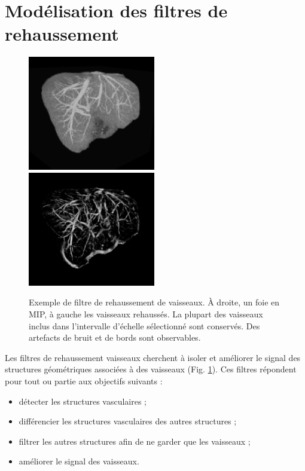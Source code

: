   \section{Modélisation des filtres de rehaussement}

  \begin{figure}[h]
    \centering
    \includegraphics[height=5cm]{Images/enhancement_part1.png}
    \includegraphics[height=5cm]{Images/enhancement_part2.png}
    \caption{Exemple de filtre de rehaussement de vaisseaux. À droite, un foie en MIP, à gauche les vaisseaux rehaussés. La plupart des vaisseaux inclus dans l'intervalle d'échelle sélectionné sont conservés. Des artefacts de bruit et de bords sont observables.}
    \label{fig:exemple_vesselness}
  \end{figure}

  Les filtres de rehaussement vaisseaux cherchent à isoler et améliorer le signal des structures géométriques associées à des vaisseaux (Fig. \ref{fig:exemple_vesselness}). Ces filtres répondent pour tout ou partie aux objectifs suivants :

  \begin{itemize}
  \item détecter les structures vasculaires ;
  \item différencier les structures vasculaires des autres structures ;
  \item filtrer les autres structures afin de ne garder que les vaisseaux ;
  \item améliorer le signal des vaisseaux.
  \end{itemize}



